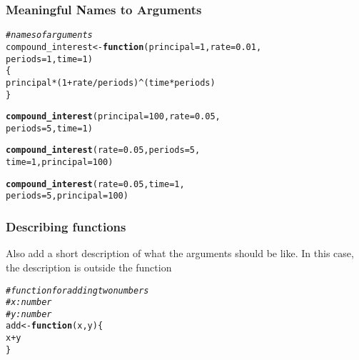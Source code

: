 \documentclass[12pt]{beamer}\usepackage[]{graphicx}\usepackage[]{color}
\makeatletter
\newcommand{\hlnum}[1]{\textcolor[rgb]{0.686,0.059,0.569}{#1}}%
\newcommand{\hlcom}[1]{\textcolor[rgb]{0.678,0.584,0.686}{\textit{#1}}}%
\newcommand{\hlopt}[1]{\textcolor[rgb]{0,0,0}{#1}}%
\newcommand{\hlstd}[1]{\textcolor[rgb]{0.345,0.345,0.345}{#1}}%
\newcommand{\hlkwa}[1]{\textcolor[rgb]{0.161,0.373,0.58}{\textbf{#1}}}%
\newcommand{\hlkwb}[1]{\textcolor[rgb]{0.69,0.353,0.396}{#1}}%
\newcommand{\hlkwc}[1]{\textcolor[rgb]{0.333,0.667,0.333}{#1}}%
\newcommand{\hlkwd}[1]{\textcolor[rgb]{0.737,0.353,0.396}{\textbf{#1}}}%
\newenvironment{kframe}{%
 \def\at@end@of@kframe{}%
 \ifinner\ifhmode%
  \def\at@end@of@kframe{\end{minipage}}%
  \begin{minipage}{\columnwidth}%
 \fi\fi%
 \def\FrameCommand##1{\hskip\@totalleftmargin \hskip-\fboxsep
 \colorbox{shadecolor}{##1}\hskip-\fboxsep
     \hskip-\linewidth \hskip-\@totalleftmargin \hskip\columnwidth}%
 \MakeFramed {\advance\hsize-\width
   \@totalleftmargin\z@ \linewidth\hsize
   \@setminipage}}%
 {\par\unskip\endMakeFramed%
 \at@end@of@kframe}
\newenvironment{knitrout}{}{} %
\makeatother
\begin{document}
\begin{frame}[fragile]
\frametitle{Meaningful Names to Arguments}

\begin{knitrout}\scriptsize
{}\color{fgcolor}\begin{kframe}
\begin{alltt}
\hlcom{# names of arguments}
\hlstd{compound_interest} \hlkwb{<-} \hlkwa{function}\hlstd{(}\hlkwc{principal} \hlstd{=} \hlnum{1}\hlstd{,} \hlkwc{rate} \hlstd{=} \hlnum{0.01}\hlstd{,}
                              \hlkwc{periods} \hlstd{=} \hlnum{1}\hlstd{,} \hlkwc{time} \hlstd{=} \hlnum{1}\hlstd{)}
\hlstd{\{}
  \hlstd{principal} \hlopt{*} \hlstd{(}\hlnum{1} \hlopt{+} \hlstd{rate}\hlopt{/}\hlstd{periods)}\hlopt{^}\hlstd{(time} \hlopt{*} \hlstd{periods)}
\hlstd{\}}

\hlkwd{compound_interest}\hlstd{(}\hlkwc{principal} \hlstd{=} \hlnum{100}\hlstd{,} \hlkwc{rate} \hlstd{=} \hlnum{0.05}\hlstd{,}
                  \hlkwc{periods} \hlstd{=} \hlnum{5}\hlstd{,} \hlkwc{time} \hlstd{=} \hlnum{1}\hlstd{)}

\hlkwd{compound_interest}\hlstd{(}\hlkwc{rate} \hlstd{=} \hlnum{0.05}\hlstd{,} \hlkwc{periods} \hlstd{=} \hlnum{5}\hlstd{,}
                  \hlkwc{time} \hlstd{=} \hlnum{1}\hlstd{,} \hlkwc{principal} \hlstd{=} \hlnum{100}\hlstd{)}

\hlkwd{compound_interest}\hlstd{(}\hlkwc{rate} \hlstd{=} \hlnum{0.05}\hlstd{,} \hlkwc{time} \hlstd{=} \hlnum{1}\hlstd{,}
                  \hlkwc{periods} \hlstd{=} \hlnum{5}\hlstd{,} \hlkwc{principal} \hlstd{=} \hlnum{100}\hlstd{)}
\end{alltt}
\end{kframe}
\end{knitrout}

\end{frame}


\begin{frame}[fragile]
\frametitle{Describing functions}

Also add a short description of what the arguments should be like. In this case, the description is outside the function
\begin{knitrout}\footnotesize
{}\color{fgcolor}\begin{kframe}
\begin{alltt}
\hlcom{# function for adding two numbers}
\hlcom{# x: number}
\hlcom{# y: number}
\hlstd{add} \hlkwb{<-} \hlkwa{function}\hlstd{(}\hlkwc{x}\hlstd{,} \hlkwc{y}\hlstd{) \{}
  \hlstd{x} \hlopt{+} \hlstd{y}
\hlstd{\}}
\end{alltt}
\end{kframe}
\end{knitrout}

\end{frame}
\end{document}
